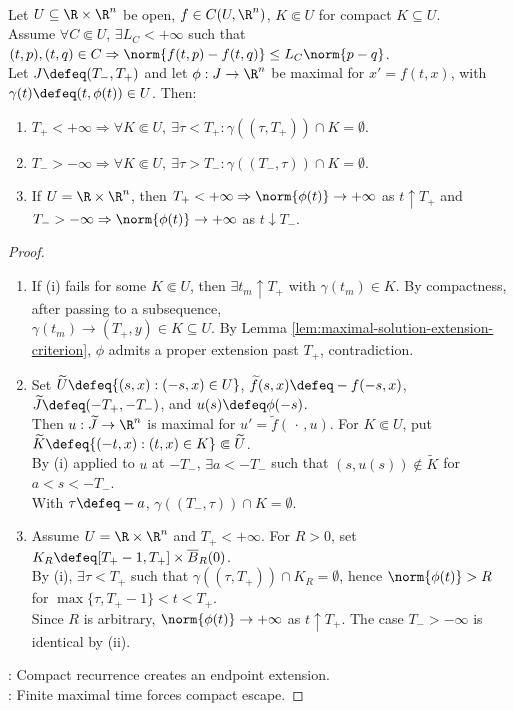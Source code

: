 \begin{corollary} \label{cor:maximal-solution-compact-escape} \\
Let $U\subseteq\R\times\R^n$ be open, $f\in C(U,\R^n)$, $K\Subset U$ for compact $K\subseteq U$.\\
Assume $\forall C\Subset U$, $\exists L_C<+\infty$ such that $(t,p),(t,q)\in C\Rightarrow\norm{f(t,p)-f(t,q)}\leq L_C\norm{p-q}$.\\
Let $J\defeq(T_-,T_+)$ and let $\phi:J\to\R^n$ be maximal for $x'=f(t,x)$, with $\gamma(t)\defeq(t,\phi(t))\in U$. Then:
\begin{enumerate}[label=(\roman*)]
\setlength{\itemsep}{0pt}
\item $T_+<+\infty\Rightarrow\forall K\Subset U,\ \exists\tau<T_+:\gamma((\tau,T_+))\cap K=\emptyset$.
\item $T_->-\infty\Rightarrow\forall K\Subset U,\ \exists\tau>T_-:\gamma((T_-,\tau))\cap K=\emptyset$.
\item If $U=\R\times\R^n$, then $T_+<+\infty\Rightarrow\norm{\phi(t)}\to+\infty$ as $t\uparrow T_+$ and $T_->-\infty\Rightarrow\norm{\phi(t)}\to+\infty$ as $t\downarrow T_-$.
\end{enumerate}
\begin{proof}
\begin{enumerate}[label=(\roman*)]
\setlength{\itemsep}{0pt}
\item If (i) fails for some $K\Subset U$, then $\exists t_m\uparrow T_+$ with $\gamma(t_m)\in K$. By compactness, after passing to a subsequence,\\
$\gamma(t_m)\to(T_+,y)\in K\subseteq U$. By Lemma \ref{lem:maximal-solution-extension-criterion}, $\phi$ admits a proper extension past $T_+$, contradiction.
\item Set $\widetilde U\defeq\{(s,x):(-s,x)\in U\}$, $\widetilde f(s,x)\defeq-f(-s,x)$, $\widetilde J\defeq(-T_+,-T_-)$, and $u(s)\defeq\phi(-s)$.\\
Then $u:\widetilde J\to\R^n$ is maximal for $u'=\widetilde f(\,\cdot\,,u)$. For $K\Subset U$, put $\widetilde K\defeq\{(-t,x):(t,x)\in K\}\Subset\widetilde U$.\\
By (i) applied to $u$ at $-T_-$, $\exists a<-T_-$ such that $(s,u(s))\notin\widetilde K$ for $a<s<-T_-$.\\
With $\tau\defeq-a$, $\gamma((T_-,\tau))\cap K=\emptyset$.
\item Assume $U=\R\times\R^n$ and $T_+<+\infty$. For $R>0$, set $K_R\defeq[T_+-1,T_+]\times\overline B_R(0)$.\\
By (i), $\exists\tau<T_+$ such that $\gamma((\tau,T_+))\cap K_R=\emptyset$, hence $\norm{\phi(t)}>R$ for $\max\{\tau,T_+-1\}<t<T_+$.\\
Since $R$ is arbitrary, $\norm{\phi(t)}\to+\infty$ as $t\uparrow T_+$. The case $T_->-\infty$ is identical by (ii).
\end{enumerate}
: Compact recurrence creates an endpoint extension.\\
: Finite maximal time forces compact escape.
\end{proof}
\end{corollary}

